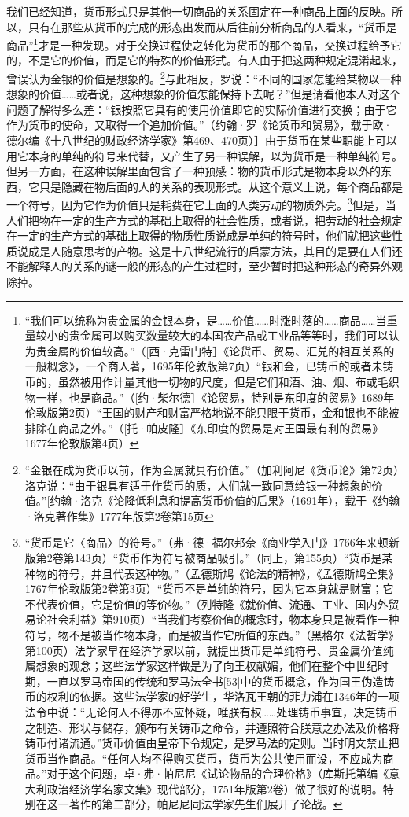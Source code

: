 \documentclass{ctexbook}
\begin{document}
我们已经知道，货币形式只是其他一切商品的关系固定在一种商品上面的反映。所以，只有在那些从货币的完成的形态出发而从后往前分析商品的人看来，“货币是商品”\footnote{“我们可以统称为贵金属的金银本身，是……价值……时涨时落的……商品……当重量较小的贵金属可以购买数量较大的本国农产品或工业品等等时，我们可以认为贵金属的价值较高。”（[西·克雷门特］《论货币、贸易、汇兑的相互关系的一般概念》，一个商人著，1695年伦敦版第7页）“银和金，已铸币的或者未铸币的，虽然被用作计量其他一切物的尺度，但是它们和酒、油、烟、布或毛织物一样，也是商品。”（[约·柴尔德］《论贸易，特别是东印度的贸易》1689年伦敦版第2页）“王国的财产和财富严格地说不能只限于货币，金和银也不能被排除在商品之外。”（[托·帕皮隆］《东印度的贸易是对王国最有利的贸易》1677年伦敦版第4页）}才是一种发现。对于交换过程使之转化为货币的那个商品，交换过程给予它的，不是它的价值，而是它的特殊的价值形式。有人由于把这两种规定混淆起来，曾误认为金银的价值是想象的。\footnote{“金银在成为货币以前，作为金属就具有价值。”（加利阿尼《货币论》第72页）洛克说：“由于银具有适于作货币的质，人们就一致同意给银一种想象的价值。”[约翰·洛克《论降低利息和提高货币价值的后果》（1691年），载于《约翰·洛克著作集》1777年版第2卷第15页}与此相反，罗说：“不同的国家怎能给某物以一种想象的价值……或者说，这种想象的价值怎能保持下去呢？”但是请看他本人对这个问题了解得多么差：“银按照它具有的使用价值即它的实际价值进行交换；由于它作为货币的使命，又取得一个追加价值。”（约翰·罗《论货币和贸易》，载于欧·德尔编《十八世纪的财政经济学家》第469、470页）］由于货币在某些职能上可以用它本身的单纯的符号来代替，又产生了另一种误解，以为货币是一种单纯符号。但另一方面，在这种误解里面包含了一种预感：物的货币形式是物本身以外的东西，它只是隐藏在物后面的人的关系的表现形式。从这个意义上说，每个商品都是一个符号，因为它作为价值只是耗费在它上面的人类劳动的物质外壳。\footnote{“货币是它〈商品〉的符号。”（弗·德·福尔邦奈《商业学入门》1766年来顿新版第2卷第143页）“货币作为符号被商品吸引。”（同上，第155页）“货币是某种物的符号，并且代表这种物。”（孟德斯鸠《论法的精神》，《孟德斯鸠全集》1767年伦敦版第2卷第3页）“货币不是单纯的符号，因为它本身就是财富；它不代表价值，它是价值的等价物。”（列特隆《就价值、流通、工业、国内外贸易论社会利益》第910页）“当我们考察价值的概念时，物本身只是被看作一种符号，物不是被当作物本身，而是被当作它所值的东西。”（黑格尔《法哲学》第100页）法学家早在经济学家以前，就提出货币是单纯符号、贵金属价值纯属想象的观念；这些法学家这样做是为了向王权献媚，他们在整个中世纪时期，一直以罗马帝国的传统和罗马法全书[53]中的货币概念，作为国王伪造铸币的权利的依据。这些法学家的好学生，华洛瓦王朝的菲力浦在1346年的一项法令中说：“无论何人不得亦不应怀疑，唯朕有权……处理铸币事宜，决定铸币之制造、形状与储存，颁布有关铸币之命令，并遵照符合朕意之办法及价格将铸币付诸流通。”货币价值由皇帝下令规定，是罗马法的定则。当时明文禁止把货币当作商品。“任何人均不得购买货币，货币为公共使用而设，不应成为商品。”对于这个问题，卓·弗·帕尼尼《试论物品的合理价格》（库斯托第编《意大利政治经济学名家文集》现代部分，1751年版第2卷）做了很好的说明。特别在这一著作的第二部分，帕尼尼同法学家先生们展开了论战。}但是，当人们把物在一定的生产方式的基础上取得的社会性质，或者说，把劳动的社会规定在一定的生产方式的基础上取得的物质性质说成是单纯的符号时，他们就把这些性质说成是人随意思考的产物。这是十八世纪流行的启蒙方法，其目的是要在人们还不能解释人的关系的谜一般的形态的产生过程时，至少暂时把这种形态的奇异外观除掉。
\end{document}
